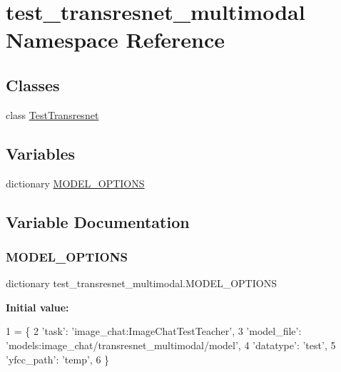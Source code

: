 \hypertarget{namespacetest__transresnet__multimodal}{}\section{test\+\_\+transresnet\+\_\+multimodal Namespace Reference}
\label{namespacetest__transresnet__multimodal}
\subsection*{Classes}
\begin{DoxyCompactItemize}
\item 
class \hyperlink{classtest__transresnet__multimodal_1_1TestTransresnet}{Test\+Transresnet}
\end{DoxyCompactItemize}
\subsection*{Variables}
\begin{DoxyCompactItemize}
\item 
dictionary \hyperlink{namespacetest__transresnet__multimodal_a8a8ef21de7a63200761fa10222cc1f66}{M\+O\+D\+E\+L\+\_\+\+O\+P\+T\+I\+O\+NS}
\end{DoxyCompactItemize}


\subsection{Variable Documentation}
\mbox{\label{namespacetest__transresnet__multimodal_a8a8ef21de7a63200761fa10222cc1f66}} 
\subsubsection{\texorpdfstring{M\+O\+D\+E\+L\+\_\+\+O\+P\+T\+I\+O\+NS}{MODEL\_OPTIONS}}
{\footnotesize\ttfamily dictionary test\+\_\+transresnet\+\_\+multimodal.\+M\+O\+D\+E\+L\+\_\+\+O\+P\+T\+I\+O\+NS}

{\bfseries Initial value\+:}
\begin{DoxyCode}
1 =  \{
2     \textcolor{stringliteral}{'task'}: \textcolor{stringliteral}{'image\_chat:ImageChatTestTeacher'},
3     \textcolor{stringliteral}{'model\_file'}: \textcolor{stringliteral}{'models:image\_chat/transresnet\_multimodal/model'},
4     \textcolor{stringliteral}{'datatype'}: \textcolor{stringliteral}{'test'},
5     \textcolor{stringliteral}{'yfcc\_path'}: \textcolor{stringliteral}{'temp'},
6 \}
\end{DoxyCode}
